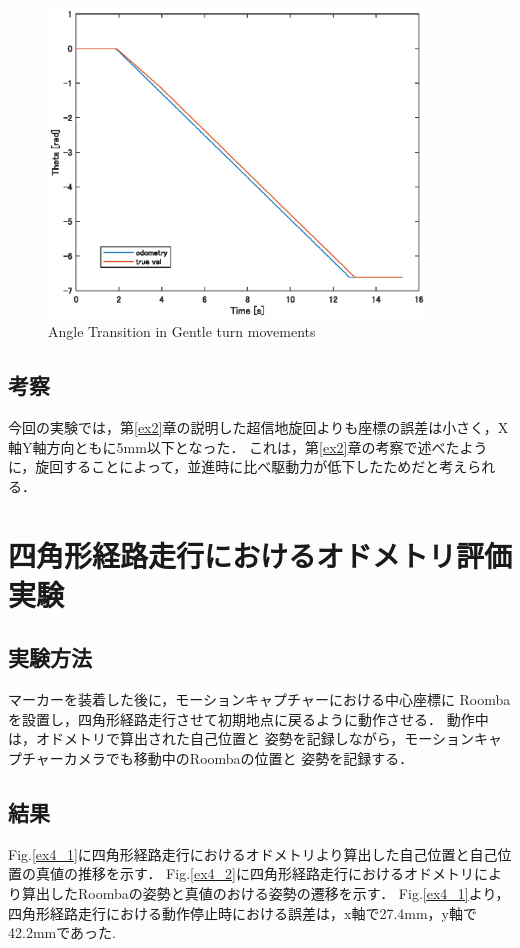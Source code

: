 \documentclass[a4paper,11pt]{jsarticle}
\begin{document}
\begin{figure}[H]\centering
\includegraphics[width=100mm]{figure/3_2.eps}
\caption{Angle Transition in Gentle turn movements}
\label{ex3_2}\vspace{0zh}\end{figure}


\subsection{考察}
今回の実験では，第\ref{ex2}章の説明した超信地旋回よりも座標の誤差は小さく，X軸Y軸方向ともに5mm以下となった．
これは，第\ref{ex2}章の考察で述べたように，旋回することによって，並進時に比べ駆動力が低下したためだと考えられる．


\newpage

\section{四角形経路走行におけるオドメトリ評価実験}\label{ex4}
\subsection{実験方法}
マーカーを装着した後に，モーションキャプチャーにおける中心座標に
Roombaを設置し，四角形経路走行させて初期地点に戻るように動作させる．
動作中は，オドメトリで算出された自己位置と
姿勢を記録しながら，モーションキャプチャーカメラでも移動中のRoombaの位置と
姿勢を記録する．

\subsection{結果}
Fig.\ref{ex4_1}に四角形経路走行におけるオドメトリより算出した自己位置と自己位置の真値の推移を示す．
Fig.\ref{ex4_2}に四角形経路走行におけるオドメトリにより算出したRoombaの姿勢と真値のおける姿勢の遷移を示す．
Fig.\ref{ex4_1}より，四角形経路走行における動作停止時における誤差は，x軸で27.4mm，y軸で42.2mmであった.
\end{document}
